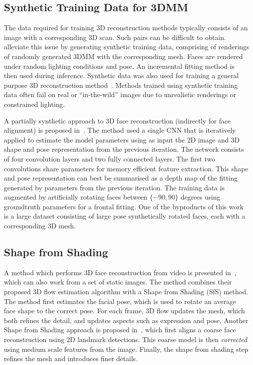 \subsection{Synthetic Training Data for 3DMM}
The data required for training 3D reconstruction methods typically
consists of an image with a corresponding 3D scan. Such pairs can be
difficult to obtain. \cite{richardson20163d} alleviate this issue by
generating synthetic training data, comprising of renderings of
randomly generated 3DMM with the corresponding mesh. Faces are
rendered under random lighting conditions and pose. An incremental
fitting method is then used during inference. Synthetic data was also
used for training a general purpose 3D reconstruction
method~\cite{li2015joint}. Methods trained using synthetic training
data often fail on real or ``in-the-wild'' images due to unrealistic
renderings or constrained lighting.

A partially synthetic approach to 3D face reconstruction (indirectly
for face alignment) is proposed in~\cite{zhu2016face}. The method used
a single CNN that is iteratively applied to estimate the model
parameters using as input the 2D image and 3D shape and pose
representation from the previous iteration. The network consists of
four convolution layers and two fully connected layers. The first two
convolutions share parameters for memory efficient feature
extraction. This shape and pose representation can best be summarised
as a depth map of the fitting generated by parameters from the
previous iteration. The training data is augmented by artificially
rotating faces between $\{-90, 90\}$ degrees using groundtruth
parameters for a frontal fitting. One of the byproducts of this work
is a large dataset consisting of large pose synthetically rotated
faces, each with a corresponding 3D mesh.

\subsection{Shape from Shading}
A method which performs 3D face reconstruction from video is presented
in~\cite{suwajanakorn2014total}, which can also work from a set of
static images. The method combines their proposed 3D flow estimation
algorithm with a Shape from Shading (SfS) method. The method first
estimates the facial pose, which is used to rotate an average face
shape to the correct pose. For each frame, 3D flow updates the mesh,
which both refines the detail, and updates aspects such as expression
and pose. Another Shape from Shading approach is proposed
in~\cite{jiang20183d}, which first aligns a coarse face reconstruction
using 2D landmark detections. This coarse model is then
\textit{corrected} using medium scale features from the
image. Finally, the shape from shading step refines the mesh and
introduces finer details.

